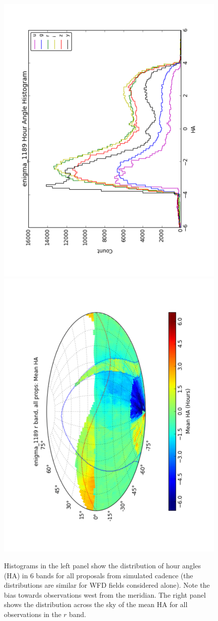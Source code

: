 \begin{figure}[t!]
\vskip -0.2in
\includegraphics[angle=270,width=0.49\hsize:,clip]{figs/enigma1189_HA.pdf}
\includegraphics[angle=270,width=0.49\hsize:,clip]{figs/enigma1189_meanHA.pdf}
\vskip -0.3in
\caption{Histograms in the left panel show the distribution of hour angles (HA) in
6 bands for all proposals from simulated cadence  (the distributions are
similar for WFD fields considered alone). Note the bias towards observations west from
the meridian. The right panel shows the distribution across the sky of the mean HA for
all observations in the $r$ band. }
\label{fig:HAenigma}
\end{figure}


